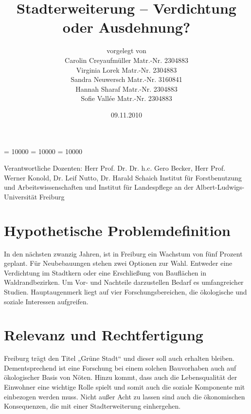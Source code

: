 \documentclass[12pt]{article}
\begin{document}
\clubpenalty = 10000
\widowpenalty = 10000 
\displaywidowpenalty = 10000

\onehalfspacing 


\begin{titlepage}

\title{Stadterweiterung – Verdichtung oder Ausdehnung?}
\author{vorgelegt von \\ 
 Carolin Creyaufmüller \quad Matr.-Nr. 2304883 \\
 Virginia Lorek \quad Matr.-Nr. 2304883 \\ 
 Sandra Neuwersch \quad Matr.-Nr. 3160841  \\ 
 Hannah Sharaf \quad Matr.-Nr. 2304883 \\ 
 Sofie Vallée \quad Matr.-Nr. 2304883 \\ }
\date{09.11.2010}
\maketitle
\vfill {Verantwortliche Dozenten: Herr Prof. Dr. Dr. h.c. Gero Becker, Herr Prof. Werner Konold, Dr. Leif Nutto, Dr. Harald Schaich} 
\vfill {\noindent Institut für Forstbenutzung und Arbeitswissenschaften und Institut für Landespflege an der Albert-Ludwigs-Universität Freiburg}

\newpage
\tableofcontents
\end{titlepage} 


\section{Hypothetische Problemdefinition}
In den nächsten zwanzig Jahren, ist in Freiburg ein Wachstum von fünf Prozent geplant. 
Für Neubebauungen stehen zwei Optionen zur Wahl. Entweder eine Verdichtung im Stadtkern 
oder eine Erschließung von Bauflächen in Waldrandbezirken. Um Vor- und Nachteile 
darzustellen Bedarf es umfangreicher Studien. 
Hauptaugenmerk liegt auf vier Forschungsbereichen, die ökologische und soziale 
Interessen aufgreifen.

\section{Relevanz und Rechtfertigung}
Freiburg trägt den Titel „Grüne Stadt“ und dieser soll auch erhalten bleiben. 
Dementsprechend ist eine Forschung bei einem solchen Bauvorhaben auch auf ökologischer 
Basis von Nöten. Hinzu kommt, dass auch die Lebensqualität der Einwohner eine wichtige 
Rolle spielt und somit auch die soziale Komponente mit einbezogen werden muss. Nicht 
außer Acht zu lassen sind auch die ökonomischen Konsequenzen, die mit einer 
Stadterweiterung einhergehen.
\end{document}
